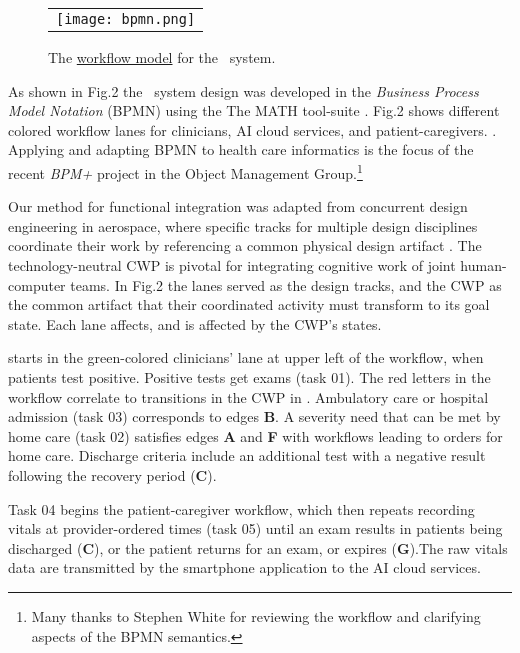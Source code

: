 \begin{figure}
  \begin{center}
    \begin{tabular}{c}
      \texttt{[image: bpmn.png]}
    \end{tabular}
  \end{center}
\caption{The \href{https://github.com/ericmercer/SPIN-bpmn-cwp-verification-paper/blob/main/26-Oct-2021-BPMN.png}{workflow model} for the \phware\ system.}
\label{fig:bpmn}
\end{figure}

As shown in Fig.2 the \phware\ system design was developed in the \emph{Business Process Model Notation} (BPMN) \cite{BPMN} using the The MATH tool-suite \cite{workflowmodel}.
Fig.2 shows different colored workflow lanes for clinicians, AI cloud services, and patient-caregivers. .
Applying and adapting BPMN to health care informatics is the focus of the recent \emph{BPM+} project in the Object Management Group.\footnote{Many thanks to Stephen White for reviewing the workflow and clarifying aspects of the BPMN semantics.}

Our method for functional integration was adapted from concurrent design engineering in aerospace, where specific tracks for multiple design disciplines coordinate their work by referencing a common physical design artifact \cite{10.1007/978-1-4471-1538-0_9}.
The technology-neutral CWP is pivotal for integrating cognitive work of joint human-computer teams. In Fig.2 the lanes served as the design tracks, and the CWP as the common artifact that their coordinated activity must transform to its goal state.
Each lane affects, and is affected by the CWP's states.

 starts in the green-colored clinicians' lane at upper left of the workflow, when patients test positive.
Positive tests get exams (task 01). The red letters in the workflow correlate to transitions in the CWP in .
Ambulatory care or hospital admission (task 03) corresponds to edges \textbf{B}.
A severity need that can be met by home care (task 02) satisfies edges \textbf{A} and \textbf{F} with workflows leading to orders for home care.
Discharge criteria include an additional test with a negative result following the recovery period (\textbf{C}).

Task 04 begins the patient-caregiver workflow, which then repeats recording vitals at provider-ordered times (task 05) until an exam results in patients being discharged (\textbf{C}), or the patient returns for an exam, or expires (\textbf{G}).The raw vitals data are transmitted by the smartphone application to the AI cloud services. 

